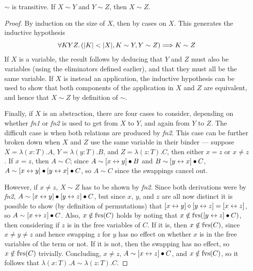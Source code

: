 \begin{lemma}
\(\sim\) is transitive.
If \(X \sim Y\) and \(Y \sim Z\), then \(X \sim Z\).
\end{lemma}
\begin{proof}
By induction on the size of \(X\), then by cases on \(X\).
This generates the inductive hypothesis
\[
\forall K Y Z. \left(|K| < |X|, K \sim Y, Y \sim Z\right) \Longrightarrow K \sim Z
\]
If \(X\) is a variable, the result follows by deducing that \(Y\) and \(Z\) must also be variables (using the eliminators defined earlier), and that they must all be the same variable.
If \(X\) is instead an application, the inductive hypothesis can be used to show that both components of the application in \(X\) and \(Z\) are equivalent, and hence that \(X \sim Z\) by definition of \(\sim\).

Finally, if \(X\) is an abstraction, there are four cases to consider, depending on whether \emph{fn1} or \emph{fn2} is used to get from \(X\) to \(Y\), and again from \(Y\) to \(Z\).
The difficult case is when both relations are produced by \emph{fn2}.
This case can be further broken down when \(X\) and \(Z\) use the same variable in their binder --- suppose \(X = \lambda (x:T).A\), \(Y = \lambda (y:T).B\), and \(Z = \lambda (z:T). C\), then either \(x = z\) or \(x \neq z\).
If \(x = z\), then \(A \sim C\); since \(A \sim [x \leftrightarrow y] \bullet B\) and \(B \sim [y \leftrightarrow x] \bullet C\), \(A \sim [x \leftrightarrow y] \bullet [y \leftrightarrow x] \bullet C\), so \(A \sim C\) since the swappings cancel out.

However, if \(x \neq z\), \(X \sim Z\) has to be shown by \emph{fn2}.
Since both derivations were by \emph{fn2}, \(A \sim [x \leftrightarrow y] \bullet [y \leftrightarrow z] \bullet C\), but since \(x\), \(y\), and \(z\) are all now distinct it is possible to show (by definition of permutations) that \([x \leftrightarrow y] \diamond [y \leftrightarrow z] = [x \leftrightarrow z]\), so \(A \sim [x \leftrightarrow z] \bullet C\).
Also, \(x \notin \mathrm{fvs}(C)\) holds by noting that \(x \notin \mathrm{fvs}([y \leftrightarrow z] \bullet C)\), then considering if \(z\) is in the free variables of \(C\).
If it is, then \(x \notin \mathrm{fvs}(C)\), since \(x \neq y \neq z\) and hence swapping \(z\) for \(y\) has no effect on whether \(x\) is in the free variables of the term or not.
If it is not, then the swapping has no effect, so \(x \notin \mathrm{fvs}(C)\) trivially.
Concluding, \(x \neq z\), \(A \sim [x \leftrightarrow z] \bullet C\), and \(x \notin \mathrm{fvs}(C)\), so it follows that \(\lambda (x:T).A \sim \lambda (z:T).C\).
\end{proof}


